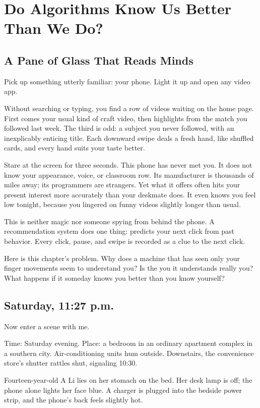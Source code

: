 \chapter[Do Algorithms Know Us Better?]{Do Algorithms Know Us Better Than We Do?}
\section{A Pane of Glass That Reads Minds}
Pick up something utterly familiar: your phone. Light it up and open any video app.

Without searching or typing, you find a row of videos waiting on the home page. First comes your usual kind of craft video, then highlights from the match you followed last week. The third is odd: a subject you never followed, with an inexplicably enticing title. Each downward swipe deals a fresh hand, like shuffled cards, and every hand suits your taste better.

Stare at the screen for three seconds. This phone has never met you. It does not know your appearance, voice, or classroom row. Its manufacturer is thousands of miles away; its programmers are strangers. Yet what it offers often hits your present interest more accurately than your deskmate does. It even knows you feel low tonight, because you lingered on funny videos slightly longer than usual.

This is neither magic nor someone spying from behind the phone. A recommendation system does one thing: predicts your next click from past behavior. Every click, pause, and swipe is recorded as a clue to the next click.

Here is this chapter's problem. Why does a machine that has seen only your finger movements seem to understand you? Is the you it understands really you? What happens if it someday knows you better than you know yourself?

\section{Saturday, 11:27 p.m.}
Now enter a scene with me.

Time: Saturday evening. Place: a bedroom in an ordinary apartment complex in a southern city. Air-conditioning units hum outside. Downstairs, the convenience store's shutter rattles shut, signaling 10:30.

Fourteen-year-old A Li lies on her stomach on the bed. Her desk lamp is off; the phone alone lights her face blue. A charger is plugged into the bedside power strip, and the phone's back feels slightly hot.

